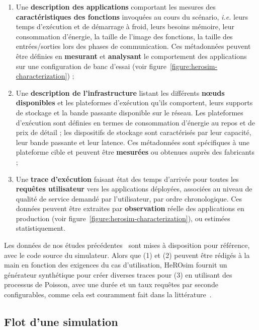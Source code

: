 \begin{enumerate}
    \item Une \textbf{description des applications} comportant les mesures des \textbf{caractéristiques des fonctions} invoquées au cours du scénario, \textit{i.e.} leurs temps d'exécution et de démarrage à froid, leurs besoins mémoire, leur consommation d'énergie, la taille de l'image des fonctions, la taille des entrées/sorties lors des phases de communication. Ces métadonnées peuvent être définies en \textbf{mesurant} et \textbf{analysant} le comportement des applications sur une configuration de banc d'essai (voir figure~\ref{figure:herosim-characterization}) ;
    \item Une \textbf{description de l'infrastructure} listant les différents \textbf{nœuds disponibles} et les plateformes d'exécution qu'ils comportent, leurs supports de stockage et la bande passante disponible sur le réseau. Les plateformes d'exécution sont définies en termes de consommation d'énergie au repos et de prix de détail ; les dispositifs de stockage sont caractérisés par leur capacité, leur bande passante et leur latence. Ces métadonnées sont spécifiques à une plateforme cible et peuvent être \textbf{mesurées} ou obtenues auprès des fabricants ;
    \item Une \textbf{trace d'exécution} faisant état des temps d'arrivée pour toutes les \textbf{requêtes utilisateur} vers les applications déployées, associées au niveau de qualité de service demandé par l'utilisateur, par ordre chronologique. Ces données peuvent être extraites par \textbf{observation} réelle des applications en production (voir figure~\ref{figure:herosim-characterization}), ou estimées statistiquement.
\end{enumerate}

Les données de nos études précédentes~\cite{herofake, herocache} sont mises à disposition pour référence, avec le code source du simulateur. Alors que (1) et (2) peuvent être rédigés à la main en fonction des exigences du cas d'utilisation, HeROsim fournit un générateur synthétique pour créer diverses traces pour (3) en utilisant des processus de Poisson, avec une durée et un taux requêtes par seconde configurables, comme cela est couramment fait dans la littérature~\cite{herocache}. 

\subsection{Flot d'une simulation}

